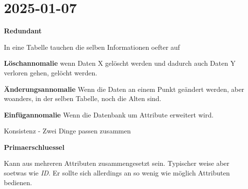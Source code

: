 \section{2025-01-07}

\startframedtipp
{\bf Redundant}

In eine Tabelle tauchen die selben Informationen oefter auf
\stopframedtipp

\startitemize[packed]
\item {\bf Löschannomalie} wenn Daten X gelöscht werden und dadurch auch Daten Y verloren gehen, gelöcht werden.
\item {\bf Änderungsannomalie} Wenn die Daten an einem Punkt geändert werden, aber woanders, in der selben Tabelle, noch die Alten sind.
\item {\bf Einfügannomalie} Wenn die Datenbank um Attribute erweitert wird.
\stopitemize

Konsistenz - Zwei Dinge passen zusammen

\startframedtipp
{\bf Primaerschluessel}

Kann aus mehreren Attributen zusammengesetzt sein. Typischer weise aber soetwas wie {\em ID}. Er sollte sich allerdings an so wenig wie möglich Attributen  bedienen.
\stopframedtipp
